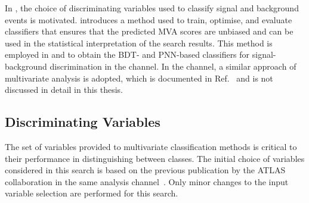 In , the choice of discriminating
variables used to classify signal and background events is
motivated.  introduces a method used to train,
optimise, and evaluate classifiers that ensures that the predicted MVA scores
are unbiased and can be used in the statistical interpretation of the search
results. This method is employed in  and 
to obtain the BDT- and PNN-based classifiers for signal-background
discrimination in the \hadhad channel. In the \lephad channel, a similar
approach of multivariate analysis is adopted, which is documented in
Ref.~\cite{HDBS-2018-40} and is not discussed in detail in this thesis.


\subsection{Discriminating Variables}%
\label{sec:mva_discriminating variables}

The set of variables provided to multivariate classification methods is critical
to their performance in distinguishing between classes. The initial choice of
variables considered in this search is based on the previous publication by the
ATLAS collaboration in the same analysis
channel~\cite{HIGG-2016-16-witherratum}. Only minor changes to the input
variable selection are performed for this search.

